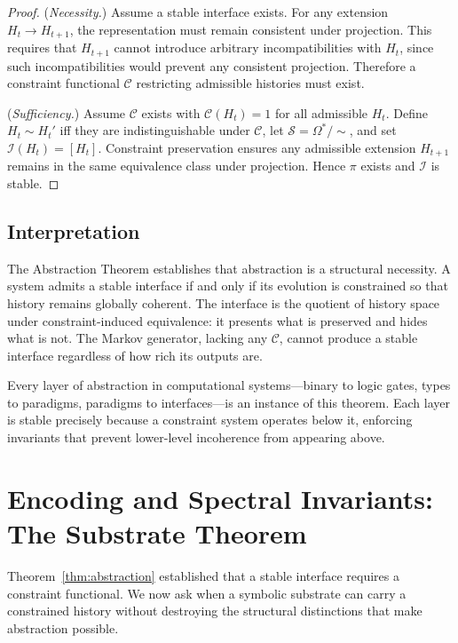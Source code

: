 \documentclass[12pt, a4paper]{article}
\theoremstyle{plain}
\theoremstyle{definition}
\theoremstyle{remark}
\begin{document}
\begin{proof}
(\textit{Necessity.}) Assume a stable interface exists. For any extension $H_t \to H_{t+1}$, the representation must remain consistent under projection. This requires that $H_{t+1}$ cannot introduce arbitrary incompatibilities with $H_t$, since such incompatibilities would prevent any consistent projection. Therefore a constraint functional $\mathcal{C}$ restricting admissible histories must exist.

(\textit{Sufficiency.}) Assume $\mathcal{C}$ exists with $\mathcal{C}(H_t) = 1$ for all admissible $H_t$. Define $H_t \sim H_t'$ iff they are indistinguishable under $\mathcal{C}$, let $\mathcal{S} = \Omega^*/{\sim}$, and set $\mathcal{I}(H_t) = [H_t]$. Constraint preservation ensures any admissible extension $H_{t+1}$ remains in the same equivalence class under projection. Hence $\pi$ exists and $\mathcal{I}$ is stable.
\end{proof}

\subsection{Interpretation}

The Abstraction Theorem establishes that abstraction is a structural necessity. A system admits a stable interface if and only if its evolution is constrained so that history remains globally coherent. The interface is the quotient of history space under constraint-induced equivalence: it presents what is preserved and hides what is not. The Markov generator, lacking any $\mathcal{C}$, cannot produce a stable interface regardless of how rich its outputs are.

Every layer of abstraction in computational systems---binary to logic gates, types to paradigms, paradigms to interfaces---is an instance of this theorem. Each layer is stable precisely because a constraint system operates below it, enforcing invariants that prevent lower-level incoherence from appearing above.

\section{Encoding and Spectral Invariants: The Substrate Theorem}

Theorem~\ref{thm:abstraction} established that a stable interface requires a constraint functional. We now ask when a symbolic substrate can carry a constrained history without destroying the structural distinctions that make abstraction possible.
\end{document}
